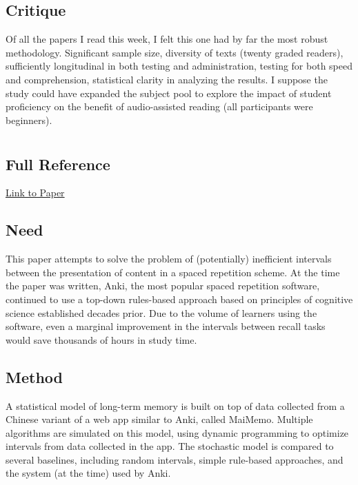 \documentclass[
	letterpaper, %
]{jdf}
\begin{document}
\subsection{Critique}
Of all the papers I read this week, I felt this one had by far the most robust methodology. Significant sample size, diversity of texts (twenty graded readers), sufficiently longitudinal in both testing and administration, testing for both speed and comprehension, statistical clarity in analyzing the results. I suppose the study could have expanded the subject pool to explore the impact of student proficiency on the benefit of audio-assisted reading (all participants were beginners). 

\section{\cite{shortestpathrepetitionscheduling}}
\subsection{Full Reference}

\href{https://dl.acm.org/doi/pdf/10.1145/3534678.3539081}{Link to Paper}

\subsection{Need}
This paper attempts to solve the problem of (potentially) inefficient intervals between the presentation of content in a spaced repetition scheme. At the time the paper was written, Anki, the most popular spaced repetition software, continued to use a top-down rules-based approach based on principles of cognitive science established decades prior. Due to the volume of learners using the software, even a marginal improvement in the intervals between recall tasks would save thousands of hours in study time.

\subsection{Method}
A statistical model of long-term memory is built on top of data collected from a Chinese variant of a web app similar to Anki, called MaiMemo. Multiple algorithms are simulated on this model, using dynamic programming to optimize intervals from data collected in the app. The stochastic model is compared to several baselines, including random intervals, simple rule-based approaches, and the system (at the time) used by Anki.
\end{document}
